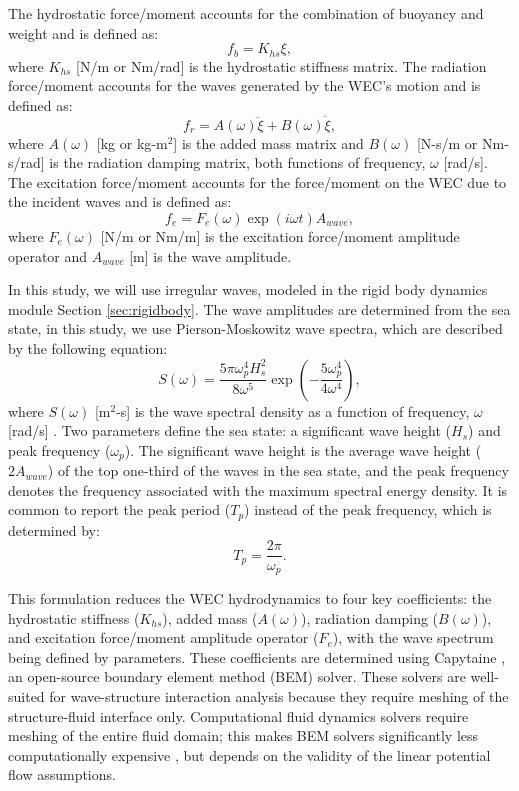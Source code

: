 \documentclass[a4paper,12pt]{elsarticle}
\begin{document}
The hydrostatic force/moment accounts for the combination of buoyancy and weight and is defined as:
\begin{equation}
    \label{eq:hydrostatic}
    f_{b} = K_{hs} \xi,
\end{equation}
\noindent where $K_{hs}$ [N/m or Nm/rad] is the hydrostatic stiffness matrix. The radiation force/moment accounts for the waves generated by the WEC's motion and is defined as:
\begin{equation}
    \label{eq:radiation}
    f_r = A(\omega) \ddot{\xi} + B(\omega) \dot{\xi},
\end{equation}
where $A(\omega)$ [kg or kg-m$^2$] is the added mass matrix and $B(\omega)$ [N-s/m or Nm-s/rad] is the radiation damping matrix, both functions of frequency, $\omega$ [rad/s]. The excitation force/moment accounts for the force/moment on the WEC due to the incident waves and is defined as:
\begin{equation}
    f_e = F_e(\omega)\exp\left({i\omega t}\right) A_{wave},
\end{equation}
\noindent where $F_e(\omega)$ [N/m or Nm/m] is the excitation force/moment amplitude operator and $A_{wave}$ [m] is the wave amplitude.

In this study, we will use irregular waves, modeled in the rigid body dynamics module Section \ref{sec:rigidbody}. The wave amplitudes are determined from the sea state, in this study, we use Pierson-Moskowitz wave spectra, which are described by the following equation:
\begin{equation}
S(\omega) = \frac{5\pi\omega_p^4H_s^2}{8\omega^5}\exp\left(-\frac{5\omega_p^4}{4\omega^4}\right),
\end{equation}
where $S(\omega)$ [m$^2$-s] is the wave spectral density as a function of frequency, $\omega$ [rad/s] \cite{falnes2020}. Two parameters define the sea state: a significant wave height ($H_s$) and peak frequency ($\omega_p$). The significant wave height is the average wave height ($2A_{wave}$) of the top one-third of the waves in the sea state, and the peak frequency denotes the frequency associated with the maximum spectral energy density. It is common to report the peak period ($T_p$) instead of the peak frequency, which is determined by:
\begin{equation}
T_p = \frac{2\pi}{\omega_p}.
\end{equation}

This formulation reduces the WEC hydrodynamics to four key coefficients: the hydrostatic stiffness ($K_{hs}$), added mass ($A(\omega)$), radiation damping ($B(\omega)$), and excitation force/moment amplitude operator ($F_e$), with the wave spectrum being defined by parameters. These coefficients are determined using Capytaine \cite{ancellin_capytaine_2019}, an open-source boundary element method (BEM) solver. These solvers are well-suited for wave-structure interaction analysis because they require meshing of the structure-fluid interface only. Computational fluid dynamics solvers require meshing of the entire fluid domain; this makes BEM solvers significantly less computationally expensive \cite{bem_wave}, but depends on the validity of the linear potential flow assumptions.
\end{document}
